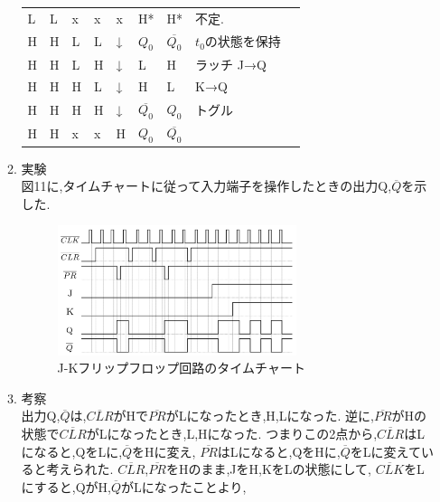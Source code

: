 \documentclass[twocolumn, 10pt,a4j]{jsarticle}
\begin{document}
\begin{enumerate}
\begin{enumerate}
\begin{table}[H]
\begin{tabular}{lllll|ll|ll}
                L       & L       & x       & x       & x   & H*      & H*      & 不定.  \\
                H       & H       & L       & L       & ↓   & $Q_{0}$ & $\overline{Q_{0}}$ & $t_{0}$の状態を保持 \\
                H       & H       & L       & H       & ↓   & L       & H       & ラッチ J→Q \\
                H       & H       & H       & L       & ↓   & H       & L       & K→Q \\
                H       & H       & H       & H       & ↓   & $\overline{Q_{0}}$ & $Q_{0}$ & トグル \\
                H       & H       & x       & x       & H   & $Q_{0}$ & $\overline{Q_{0}}$ & 
                \end{tabular}
            \end{table}
          \item 実験 \\
            図11に,タイムチャートに従って入力端子を操作したときの出力Q,$\overline{Q}$を示した.
            \begin{figure}[H]
              \begin{center}
                \includegraphics[width=7cm]{../img/junjokairo/jk_flip_flop_time_chart.png}
                \caption{J-Kフリップフロップ回路のタイムチャート}
              \end{center}
            \end{figure}
          \item 考察 \\
            出力Q,$\overline{Q}$は,$\overline{CLR}$がHで$\overline{PR}$がLになったとき,H,Lになった.
            逆に,$\overline{PR}$がHの状態で$\overline{CLR}$がLになったとき,L,Hになった.
            つまりこの2点から,$\overline{CLR}$はLになると,QをLに,$\overline{Q}$をHに変え,
            $\overline{PR}$はLになると,QをHに,$\overline{Q}$をLに変えていると考えられた.
            $\overline{CLR}$,$\overline{PR}$をHのまま,JをH,KをLの状態にして,
            $\overline{CLK}$をLにすると,QがH,$\overline{Q}$がLになったことより,

\end{enumerate}
\end{enumerate}
\end{document}
